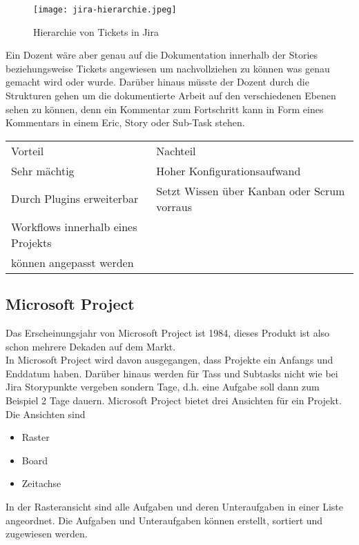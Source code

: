 \begin{figure}[H]
	\centering
	\texttt{[image: jira-hierarchie.jpeg]}
    \caption{Hierarchie von Tickets in Jira }
	\label{fig:hierarchyjira}
\end{figure}

Ein Dozent wäre aber genau auf die Dokumentation innerhalb der Stories beziehungsweise Tickets angewiesen um nachvollziehen zu können was genau gemacht wird oder wurde. Darüber hinaus müsste der Dozent durch die Strukturen gehen um die dokumentierte Arbeit auf den verschiedenen Ebenen sehen zu können, denn ein Kommentar zum Fortschritt kann in Form eines Kommentars in einem Eric, Story oder Sub-Task stehen. 

\begin{table}[]
    \begin{tabular}{ll}
    Vorteil         & Nachteil                                    \\
    Sehr mächtig    & Hoher Konfigurationsaufwand                 \\
    Durch Plugins erweiterbar   & Setzt Wissen über Kanban oder Scrum vorraus \\
    Workflows innerhalb eines Projekts\\
    können angepasst werden     &                                            
    \end{tabular}
\end{table}

\subsection{Microsoft Project}

Das Erscheinungsjahr von Microsoft Project ist 1984, dieses Produkt ist also schon mehrere Dekaden auf dem Markt.\\
In Microsoft Project wird davon ausgegangen, dass Projekte ein Anfangs und Enddatum haben. Darüber hinaus werden für Tass und Subtasks nicht wie bei Jira Storypunkte vergeben sondern Tage, d.h. eine Aufgabe soll dann zum Beispiel 2 Tage dauern. Microsoft Project bietet drei Ansichten für ein Projekt. \\
Die Ansichten sind
\begin{itemize}
\item Raster  
\item Board  
\item Zeitachse
\end{itemize}
In der Rasteransicht sind alle Aufgaben und deren Unteraufgaben in einer Liste angeordnet. Die Aufgaben und Unteraufgaben können erstellt, sortiert und zugewiesen werden.  

